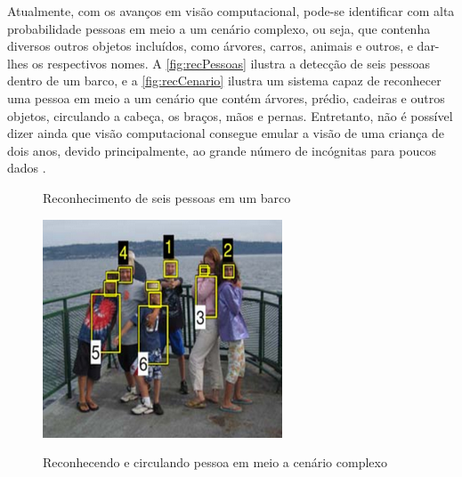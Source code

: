 Atualmente, com os avanços em visão computacional, pode-se identificar com alta probabilidade pessoas em meio a um cenário complexo, ou seja, que contenha diversos outros objetos incluídos, como árvores, carros, animais e outros, e dar-lhes os respectivos nomes. A \autoref{fig:recPessoas} ilustra a detecção de seis pessoas dentro de um barco, e a \autoref{fig:recCenario} ilustra um sistema capaz de reconhecer uma pessoa em meio a um cenário que contém árvores, prédio, cadeiras e outros objetos, circulando a cabeça, os braços, mãos e pernas. Entretanto, não é possível dizer ainda que visão computacional consegue emular a visão de uma criança de dois anos, devido principalmente, ao grande número de incógnitas para poucos dados \cite{caap}.

\begin{figure}[htb]
 \label{fig:reconhecimento}
 \centering
  \begin{minipage}{0.48\textwidth}
    \centering
    \caption{Reconhecimento de seis pessoas em um barco} \label{fig:recPessoas}
    \includegraphics[width=.95\textwidth]{figuras/f1c2.png}
  \end{minipage}
  \hfill
  \begin{minipage}{0.48\textwidth}
    \centering
    \caption{Reconhecendo e circulando pessoa em meio a cenário complexo} \label{fig:recCenario}

\end{minipage}
\end{figure}
